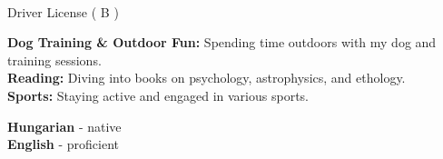 \documentclass[9pt]{developercv}
\begin{document}

\begin{minipage}[t]{0.3\textwidth}
	\vspace{-\baselineskip} %

    \\ Driver License ( B )
\end{minipage}
\hfill
\begin{minipage}[t]{0.3\textwidth}
	\vspace{-\baselineskip} %
	
 
	\textbf{Dog Training \& Outdoor Fun:} Spending time outdoors with my dog and training sessions. \\
\textbf{Reading:} Diving into books on psychology, astrophysics, and ethology. \\
\textbf{Sports:} Staying active and engaged in various sports.
\end{minipage}
\hfill
\begin{minipage}[t]{0.3\textwidth}
	\vspace{-\baselineskip} %
	
	
	
	\textbf{Hungarian} - native\\
	\textbf{English} - proficient\\
	
	
\end{minipage}

\end{document}
